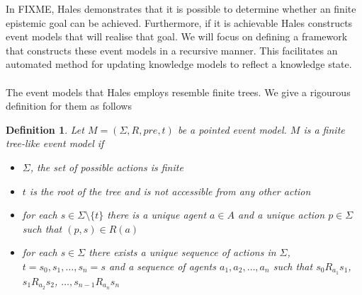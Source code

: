 \documentclass[12pt, a4paper, titlepage]{scrartcl}
\newtheorem{defn}{Definition}
\begin{document}
In FIXME, Hales demonstrates that it is possible to determine whether an
finite epistemic goal can be achieved.
Furthermore, if it is achievable Hales constructs event models that will realise
that goal.
We will focus on defining a framework that constructs these event models in a
recursive manner.
This facilitates an automated method for updating knowledge models to reflect a
knowledge state.\\
\\
The event models that Hales employs resemble finite trees.
We give a rigourous definition for them as follows

\begin{defn} \label{finTree}
Let $M = (\Sigma, R, pre, t)$ be a pointed event model.
$M$ is a finite tree-like event model if
\begin{itemize}
	\item $\Sigma$, the set of possible actions is finite
	\item $t$ is the root of the tree and is not accessible from any other action
	\item for each $s \in \Sigma \setminus \{ t \}$ there is a unique agent $a \in A$ and a unique
	action $p \in \Sigma$ such that $(p,s) \in R(a)$
	\item for each $s \in \Sigma$ there exists a unique sequence of actions in $\Sigma$, $t = s_0,
	s_1, \ldots, s_n = s$ and a sequence of agents $a_1, a_2, \ldots, a_n$ such that $s_0 R_{a_1}
	s_1$, $s_1 R_{a_2} s_2$, $\ldots, s_{n-1} R_{a_n} s_n$
\end{itemize}
\end{defn}
\end{document}

